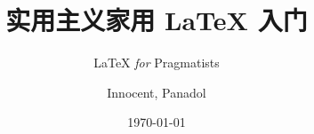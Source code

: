 \documentclass[fontset=fandol,punct=kaiming]{ctexbeamer}
\title{实用主义家用 \LaTeX{} 入门}
\subtitle{\LaTeX{} \textit{for} Pragmatists}
\author{Innocent, Panadol}
\date{\today}
\begin{document}
\maketitle
\makeatletter

\begin{frame}

\end{frame}
\end{document}
